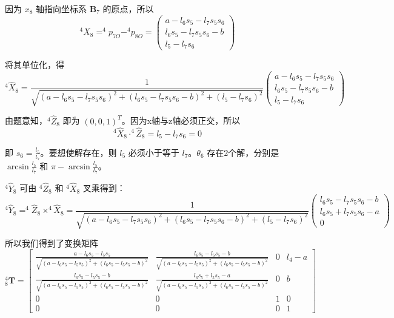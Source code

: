 \documentclass{homework}
\begin{document}
\begin{sol}
因为 $ x_8 $ 轴指向坐标系{ $ \mathbf{B}_7 $ }的原点，所以
\[
  ^{4}X_{8} = ^{4}p_{7O} - ^{4}p_{8O} =
  \begin{pmatrix}
    a - l_6s_{5} - l_7s_{5}s_{6} \\
    l_6s_{5} - l_7s_{5}s_{6} - b \\
    l_5 - l_7s_{6}
  \end{pmatrix}
\]

将其单位化，得
\[
  ^{4}\hat{X}_{8} =
  \frac{1}{\sqrt{\left(a - l_6 s_5 - l_7 s_5 s_6\right)^2 + \left(l_6 s_5 - l_7 s_5 s_6 - b\right)^2 + \left(l_5 - l_7 s_6\right)^2}}
  \begin{pmatrix}
    a - l_6 s_5 - l_7 s_5 s_6 \\
    l_6 s_5 - l_7 s_5 s_6 - b \\
    l_5 - l_7 s_6
  \end{pmatrix}
\]

由题意知，$ ^{4}\hat{Z}_{8} $ 即为 $ (0, 0, 1)^T $。因为x轴与z轴必须正交，所以
\[
  ^{4}\hat{X}_{8} \cdot ^{4}\hat{Z}_{8} = l_5 - l_7s_{6} = 0
\]

即 $ s_{6} = \frac{l_5}{l_7} $。要想使解存在，则 $ l_5 $ 必须小于等于 $ l_7 $。$ \theta_6 $ 存在2个解，分别是 $ \arcsin{\frac{l_5}{l_7}} $ 和 $ \pi - \arcsin{\frac{l_5}{l_7}} $。

$ ^{4}\hat{Y}_{8} $ 可由 $ ^{4}\hat{Z}_{8} $ 和 $ ^{4}\hat{X}_{8} $ 叉乘得到：
\[
  ^{4}\hat{Y}_{8} = ^{4}\hat{Z}_{8} \times ^{4}\hat{X}_{8} = 
  \frac{1}{\sqrt{\left(a - l_6 s_5 - l_7 s_5 s_6\right)^2 + \left(l_6 s_5 - l_7 s_5 s_6 - b\right)^2 + \left(l_5 - l_7 s_6\right)^2}}
  \begin{pmatrix}
    l_6s_{5} - l_7s_{5}s_{6} - b \\
    l_6s_{5} + l_7s_{5}s_{6} - a \\
    0
  \end{pmatrix}
\]

所以我们得到了变换矩阵
\[
  _8^4\mathbf{T} = 
  \begin{bmatrix} 
    \frac{a - l_6 s_5 - l_5 s_5}{\sqrt{(a - l_6 s_5 - l_5 s_5)^2 + (l_6 s_5 - l_5 s_5 - b)^2}} & \frac{l_6 s_5 - l_5 s_5 - b}{\sqrt{(a - l_6 s_5 - l_5 s_5)^2 + (l_6 s_5 - l_5 s_5 - b)^2}} & 0 & l_4 - a \\
    \frac{l_6 s_5 - l_5 s_5 - b}{\sqrt{(a - l_6 s_5 - l_5 s_5)^2 + (l_6 s_5 - l_5 s_5 - b)^2}} & \frac{l_6 s_5 + l_5 s_5 - a}{\sqrt{(a - l_6 s_5 - l_5 s_5)^2 + (l_6 s_5 - l_5 s_5 - b)^2}} & 0 & b \\
    0 & 0 & 1 & 0 \\
    0 & 0 & 0 & 1
  \end{bmatrix}
\]


\end{sol}
\end{document}
